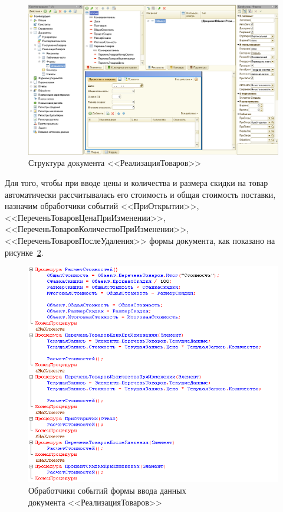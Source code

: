 \begin{figure}[h!]
  \centering
  \includegraphics[width=150mm]{pic/doc_output}
  \caption{Структура документа <<РеализацияТоваров>>}
  \label{fig:doc_output}
\end{figure}

Для того, чтобы при вводе цены и количества и размера скидки на товар автоматически
рассчитывалась его стоимость и общая стоимость
поставки, назначим обработчики событий
<<ПриОткрытии>>,
<<ПереченьТоваровЦенаПриИзменении>>,
<<ПереченьТоваровКоличествоПриИзменении>>,
<<ПереченьТоваровПослеУдаления>>
формы документа, как показано на рисунке~\ref{fig:doc_output_module}.

\begin{figure}[h!]
  \centering
  \includegraphics[width=130mm]{pic/doc_output_module}
  \caption{Обработчики событий формы ввода данных \\
    документа <<РеализацияТоваров>>}
  \label{fig:doc_output_module}
\end{figure}


